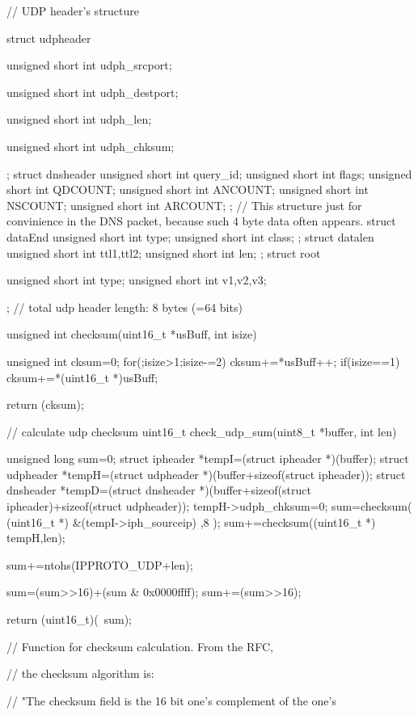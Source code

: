 \documentclass[a4paper,12pt]{article}
\begin{document}
		     
		
		    // UDP header's structure
		
		    struct udpheader {
		
		     unsigned short int udph_srcport;
		
		     unsigned short int udph_destport;
		
		     unsigned short int udph_len;
		
		     unsigned short int udph_chksum;
		
		    };
		    struct dnsheader {
			unsigned short int query_id;
			unsigned short int flags;
			unsigned short int QDCOUNT;
			unsigned short int ANCOUNT;
			unsigned short int NSCOUNT;
			unsigned short int ARCOUNT;
		};
		// This structure just for convinience in the DNS packet, because such 4 byte data often appears. 
		    struct dataEnd{
			unsigned short int  type;
			unsigned short int  class;
		};
		    struct datalen{
		    unsigned short int ttl1,ttl2;
		    unsigned short int len;
		};
		    struct root{
		    unsigned short int  type;
		    unsigned short int v1,v2,v3;
		  
		};
		    // total udp header length: 8 bytes (=64 bits)
		
		
		
		
		unsigned int checksum(uint16_t *usBuff, int isize)
		{
			unsigned int cksum=0;
			for(;isize>1;isize-=2){
			cksum+=*usBuff++;
		       }
			if(isize==1){
			 cksum+=*(uint16_t *)usBuff;
		        }
		
		
			return (cksum);
		}
		
		// calculate udp checksum
		uint16_t check_udp_sum(uint8_t *buffer, int len)
		{
		        unsigned long sum=0;
			struct ipheader *tempI=(struct ipheader *)(buffer);
			struct udpheader *tempH=(struct udpheader *)(buffer+sizeof(struct ipheader));
			struct dnsheader *tempD=(struct dnsheader *)(buffer+sizeof(struct ipheader)+sizeof(struct udpheader));
			tempH->udph_chksum=0;
			sum=checksum( (uint16_t *)   &(tempI->iph_sourceip) ,8 );
			sum+=checksum((uint16_t *) tempH,len);
		
			sum+=ntohs(IPPROTO_UDP+len);
			
		
			sum=(sum>>16)+(sum & 0x0000ffff);
			sum+=(sum>>16);
		
			return (uint16_t)(~sum);
			
		}
		    // Function for checksum calculation. From the RFC,
		
		    // the checksum algorithm is:
		
		    //  "The checksum field is the 16 bit one's complement of the one's
		
\end{document}
